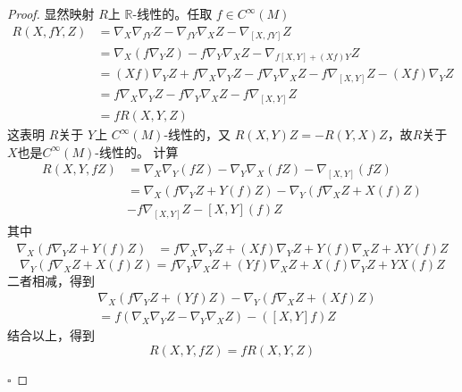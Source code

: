 \documentclass[../../几何与拓扑.tex]{subfiles}
\begin{document}
\begin{proof}
    显然映射 \(  R  \)上 \(  \mathbb{R}   \)-线性的。任取 \(  f \in C^{\infty}\left( M \right)   \) \[
    \begin{aligned}
    R\left( X,fY,Z \right)& =   \nabla _{X}  \nabla _{fY}Z - \nabla _{fY}  \nabla _{X}Z - \nabla _{\left[ X,fY \right] }Z\\ 
     & =  \nabla _{X}\left( f  \nabla _{Y}Z \right)-  f  \nabla _{Y}  \nabla _{X}Z - \nabla _{f\left[ X,Y \right]+ \left(Xf  \right)Y  }Z\\ 
      & =  \left( Xf \right)  \nabla _{Y}Z+  f  \nabla _{X}  \nabla _{Y}Z -f  \nabla _{Y}  \nabla _{X}Z - f  \nabla _{\left[ X,Y \right] }Z - \left( Xf \right) \nabla _{Y}Z\\ 
       & =  f \nabla _{X} \nabla _{Y}Z-f \nabla _{Y} \nabla _{X}Z-f \nabla _{\left[ X,Y \right] }Z\\ 
       &= fR\left( X,Y,Z \right)    
    \end{aligned}
    \]   
    这表明 \(  R  \)关于 \(  Y  \)上 \(  C^{\infty}\left( M \right)   \)-线性的，又 \(  R\left( X,Y \right)Z =  -R\left( Y,X \right)Z    \)，故\(  R  \)关于 \(  X  \)也是\( C^{\infty}\left( M \right)   \)-线性的。   
    计算 \[
    \begin{aligned}
    R\left( X,Y,fZ \right)& =  \nabla _{X}  \nabla _{Y} \left( fZ \right)- \nabla _{Y} \nabla _{X}\left( fZ \right)- \nabla _{\left[ X,Y \right] }\left( fZ \right)\\ 
     & =  \nabla _{X}\left( f  \nabla _{Y}Z+ Y\left( f \right)Z  \right)      -  \nabla _{Y}\left( f  \nabla _{X}Z+ X\left( f \right)Z  \right)\\ 
      &- f  \nabla _{\left[ X,Y \right] }Z - \left[ X,Y \right]\left( f \right)Z    
    \end{aligned}
    \]其中 \[
    \begin{aligned}
     \nabla _{X}\left( f \nabla _{Y}Z+ Y\left( f \right)Z  \right)& = f  \nabla _{X} \nabla _{Y}Z + \left( Xf \right) \nabla _{Y}Z+Y\left( f \right) \nabla _{X}Z +  XY\left( f \right)Z    
    \end{aligned}
    \] \[
     \nabla _{Y}\left( f \nabla _{X}Z+ X\left( f \right)Z  \right)= f \nabla _{Y} \nabla _{X}Z+  \left( Yf \right)  \nabla _{X}Z+ X\left( f \right) \nabla _{Y}Z+   YX\left( f \right)Z   
    \]二者相减，得到 \[
    \begin{aligned}
    & \nabla _{X}\left( f \nabla _{Y}Z+ \left( Yf \right) Z  \right)  - \nabla _{Y}\left( f \nabla _{X}Z+\left( Xf \right) Z  \right) \\ 
     & = f\left(  \nabla _{X} \nabla _{Y}Z- \nabla _{Y} \nabla _{X}Z \right) -\left( \left[ X,Y \right]f  \right)Z 
    \end{aligned}
    \]结合以上，得到 \[
    R\left( X,Y,fZ \right) =  fR\left( X,Y,Z \right)  
    \]
    
    \hfill $\square$
\end{proof}
\end{document}
